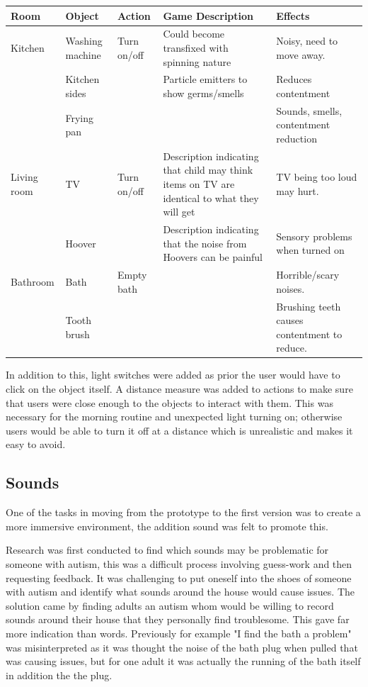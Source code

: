 \documentclass[11pt]{report}
\begin{document}
\begin{table}[H]
    \begin{tabular}{| p{2cm} | p{2cm} | p{3cm} | p{3cm} | p{4cm} | }
    \hline
    Room & Object & Action & Game Description & Effects                                                                  \\
    \hline
    \hline
        Kitchen & Washing machine & Turn on/off & Could become transfixed with spinning nature & Noisy, need to move away. \\
    \hline
    & Kitchen sides & & Particle emitters to show germs/smells & Reduces contentment \\
    \hline
    & Frying pan & & & Sounds, smells, contentment reduction \\
    \hline
    Living room & TV & Turn on/off & Description indicating that child may think items on TV are identical to what they will get & TV being too loud may hurt. \\
    \hline
    & Hoover & & Description indicating that the noise from Hoovers can be painful & Sensory problems when turned on \\
    \hline
    Bathroom & Bath & Empty bath & & Horrible/scary noises. \\
    \hline
    & Tooth brush & & & Brushing teeth causes contentment to reduce. \\
    \hline
    \end{tabular}
\end{table}

In addition to this, light switches were added as prior the user would have to click on the object itself. A distance measure was added to actions to make sure that users were close enough to the objects to interact with them. This was necessary for the morning routine and unexpected light turning on; otherwise users would be able to turn it off at a distance which is unrealistic and makes it easy to avoid.

\subsection{Sounds}
One of the tasks in moving from the prototype to the first version was to create a more immersive environment, the addition sound was felt to promote this.

Research was first conducted to find which sounds may be problematic for someone with autism, this was a difficult process involving guess-work and then requesting feedback. It was challenging to put oneself into the shoes of someone with autism and identify what sounds around the house would cause issues. The solution came by finding adults an autism whom would be willing to record sounds around their house that they personally find troublesome. This gave far more indication than words. Previously for example "I find the bath a problem" was misinterpreted as it was thought the noise of the bath plug when pulled that was causing issues, but for one adult it was actually the running of the bath itself in addition the the plug.
\end{document}

